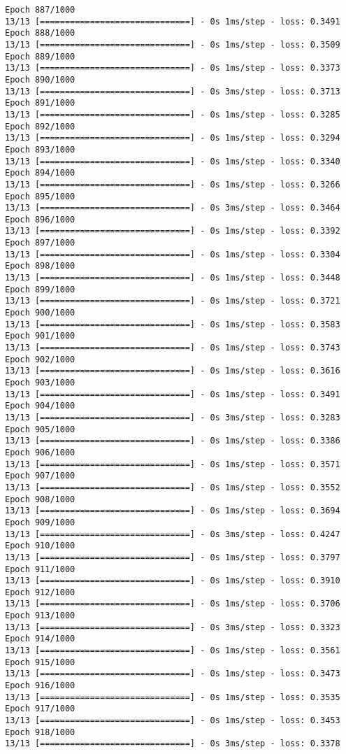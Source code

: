 \documentclass[11pt]{article}
\begin{document}
\begin{Verbatim}[commandchars=\\\{\}]
Epoch 887/1000
13/13 [==============================] - 0s 1ms/step - loss: 0.3491
Epoch 888/1000
13/13 [==============================] - 0s 1ms/step - loss: 0.3509
Epoch 889/1000
13/13 [==============================] - 0s 1ms/step - loss: 0.3373
Epoch 890/1000
13/13 [==============================] - 0s 3ms/step - loss: 0.3713
Epoch 891/1000
13/13 [==============================] - 0s 1ms/step - loss: 0.3285
Epoch 892/1000
13/13 [==============================] - 0s 1ms/step - loss: 0.3294
Epoch 893/1000
13/13 [==============================] - 0s 1ms/step - loss: 0.3340
Epoch 894/1000
13/13 [==============================] - 0s 1ms/step - loss: 0.3266
Epoch 895/1000
13/13 [==============================] - 0s 3ms/step - loss: 0.3464
Epoch 896/1000
13/13 [==============================] - 0s 1ms/step - loss: 0.3392
Epoch 897/1000
13/13 [==============================] - 0s 1ms/step - loss: 0.3304
Epoch 898/1000
13/13 [==============================] - 0s 1ms/step - loss: 0.3448
Epoch 899/1000
13/13 [==============================] - 0s 1ms/step - loss: 0.3721
Epoch 900/1000
13/13 [==============================] - 0s 1ms/step - loss: 0.3583
Epoch 901/1000
13/13 [==============================] - 0s 1ms/step - loss: 0.3743
Epoch 902/1000
13/13 [==============================] - 0s 1ms/step - loss: 0.3616
Epoch 903/1000
13/13 [==============================] - 0s 1ms/step - loss: 0.3491
Epoch 904/1000
13/13 [==============================] - 0s 3ms/step - loss: 0.3283
Epoch 905/1000
13/13 [==============================] - 0s 1ms/step - loss: 0.3386
Epoch 906/1000
13/13 [==============================] - 0s 1ms/step - loss: 0.3571
Epoch 907/1000
13/13 [==============================] - 0s 1ms/step - loss: 0.3552
Epoch 908/1000
13/13 [==============================] - 0s 1ms/step - loss: 0.3694
Epoch 909/1000
13/13 [==============================] - 0s 3ms/step - loss: 0.4247
Epoch 910/1000
13/13 [==============================] - 0s 1ms/step - loss: 0.3797
Epoch 911/1000
13/13 [==============================] - 0s 1ms/step - loss: 0.3910
Epoch 912/1000
13/13 [==============================] - 0s 1ms/step - loss: 0.3706
Epoch 913/1000
13/13 [==============================] - 0s 3ms/step - loss: 0.3323
Epoch 914/1000
13/13 [==============================] - 0s 1ms/step - loss: 0.3561
Epoch 915/1000
13/13 [==============================] - 0s 1ms/step - loss: 0.3473
Epoch 916/1000
13/13 [==============================] - 0s 1ms/step - loss: 0.3535
Epoch 917/1000
13/13 [==============================] - 0s 1ms/step - loss: 0.3453
Epoch 918/1000
13/13 [==============================] - 0s 3ms/step - loss: 0.3378

\end{Verbatim}
\end{document}

